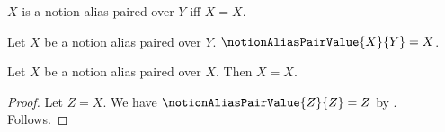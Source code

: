

\begin{definition}\label{notion_alias_paired}
    $X$ is a notion alias paired over $Y$ iff $X=X$.
\end{definition}

\begin{definition}\label{notion_alias_pair_value}
    Let $X$ be a notion alias paired over $Y$.
    $\notionAliasPairValue{X}{Y}=X$.
\end{definition}

\begin{proposition}\label{notion_alias_repeated}
    Let $X$ be a notion alias paired over $X$.
    Then $X=X$.
\end{proposition}
\begin{proof}
    Let $Z=X$.
    We have $\notionAliasPairValue{Z}{Z}=Z$
        by .
    Follows.
\end{proof}
